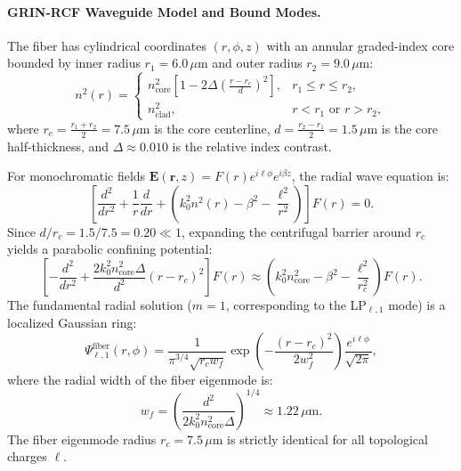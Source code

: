 \documentclass[11pt,a4paper]{article}
\begin{document}
\paragraph{GRIN-RCF Waveguide Model and Bound Modes.}
The fiber has cylindrical coordinates $(r, \phi, z)$ with an annular graded-index core bounded by inner radius $r_1 = 6.0\,\mu\text{m}$ and outer radius $r_2 = 9.0\,\mu\text{m}$:
\begin{equation}
n^2(r) = \begin{cases}
n_{\text{core}}^2 \left[ 1 - 2\Delta \left( \frac{r - r_c}{d} \right)^2 \right], & r_1 \le r \le r_2, \\
n_{\text{clad}}^2, & r < r_1 \text{ or } r > r_2,
\end{cases}
\label{eq:rcf_profile}
\end{equation}
where $r_c = \frac{r_1 + r_2}{2} = 7.5\,\mu\text{m}$ is the core centerline, $d = \frac{r_2 - r_1}{2} = 1.5\,\mu\text{m}$ is the core half-thickness, and $\Delta \approx 0.010$ is the relative index contrast.

For monochromatic fields $\mathbf{E}(\mathbf{r}, z) = F(r) e^{i \ell \phi} e^{i \beta z}$, the radial wave equation is:
\begin{equation}
\left[ \frac{d^2}{dr^2} + \frac{1}{r} \frac{d}{dr} + \left( k_0^2 n^2(r) - \beta^2 - \frac{\ell^2}{r^2} \right) \right] F(r) = 0.
\label{eq:radial_wave_rcf}
\end{equation}
Since $d / r_c = 1.5 / 7.5 = 0.20 \ll 1$, expanding the centrifugal barrier around $r_c$ yields a parabolic confining potential:
\begin{equation}
\left[ - \frac{d^2}{dr^2} + \frac{2 k_0^2 n_{\text{core}}^2 \Delta}{d^2} (r - r_c)^2 \right] F(r) \approx \left( k_0^2 n_{\text{core}}^2 - \beta^2 - \frac{\ell^2}{r_c^2} \right) F(r).
\label{eq:radial_parabolic_potential}
\end{equation}
The fundamental radial solution ($m=1$, corresponding to the LP$_{\ell, 1}$ mode) is a localized Gaussian ring:
\begin{equation}
\Psi_{\ell, 1}^{\text{fiber}}(r, \phi) = \frac{1}{\pi^{3/4} \sqrt{r_c w_f}} \exp\left( - \frac{(r - r_c)^2}{2 w_f^2} \right) \frac{e^{i \ell \phi}}{\sqrt{2\pi}},
\label{eq:fiber_eigenmode}
\end{equation}
where the radial width of the fiber eigenmode is:
\begin{equation}
w_f = \left( \frac{d^2}{2 k_0^2 n_{\text{core}}^2 \Delta} \right)^{1/4} \approx 1.22\,\mu\text{m}.
\label{eq:fiber_wf}
\end{equation}
The fiber eigenmode radius $r_c = 7.5\,\mu\text{m}$ is strictly identical for all topological charges $\ell$.
\end{document}
